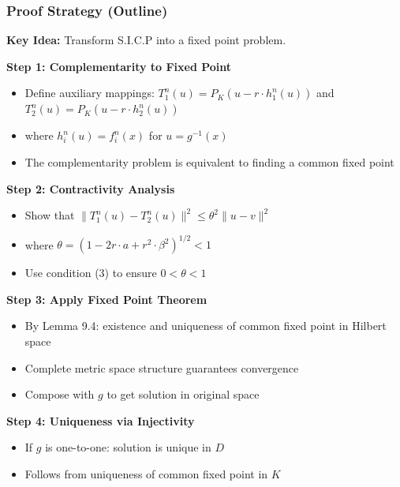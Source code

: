 \documentclass[aspectratio=169,10pt]{beamer}
\begin{document}
\begin{frame}[allowframebreaks]
\frametitle{Proof Strategy (Outline)}

\textbf{Key Idea:} Transform S.I.C.P into a fixed point problem.

\vspace{0.3cm}

\textbf{Step 1: Complementarity to Fixed Point}
\begin{itemize}
    \item Define auxiliary mappings: $T_1^n(u) = P_K(u - r \cdot h_1^n(u))$ and $T_2^n(u) = P_K(u - r \cdot h_2^n(u))$
    \item where $h_i^n(u) = f_i^n(x)$ for $u = g^{-1}(x)$
    \item The complementarity problem is equivalent to finding a common fixed point
\end{itemize}

\vspace{0.3cm}

\textbf{Step 2: Contractivity Analysis}
\begin{itemize}
    \item Show that $\|T_1^n(u) - T_2^n(u)\|^2 \leq \theta^2 \|u - v\|^2$
    \item where $\theta = (1 - 2r \cdot a + r^2 \cdot \beta^2)^{1/2} < 1$
    \item Use condition (3) to ensure $0 < \theta < 1$
\end{itemize}

\vspace{0.3cm}

\textbf{Step 3: Apply Fixed Point Theorem}
\begin{itemize}
    \item By Lemma 9.4: existence and uniqueness of common fixed point in Hilbert space
    \item Complete metric space structure guarantees convergence
    \item Compose with $g$ to get solution in original space
\end{itemize}

\vspace{0.3cm}

\textbf{Step 4: Uniqueness via Injectivity}
\begin{itemize}
    \item If $g$ is one-to-one: solution is unique in $D$
    \item Follows from uniqueness of common fixed point in $K$
\end{itemize}


\end{frame}
\end{document}
